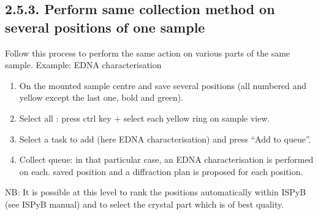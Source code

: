 \documentclass[a4paper,10pt,english]{sphinxmanual}
\begin{document}
\subsection{2.5.3. Perform same collection method on several positions of one sample}
\label{user_manual:perform-same-collection-method-on-several-positions-of-one-sample}
Follow this process to perform the same action on various parts of the same sample.
Example: EDNA characterisation
\begin{enumerate}
\item {} 
On the mounted sample centre and save several positions (all numbered and yellow except the last one, bold and green).

\item {} 
Select all : press ctrl key + select each yellow ring on sample view.

\item {} 
Select a task to add (here EDNA characterisation) and press “Add to queue”.

\item {} 
Collect queue: in that particular case, an EDNA characterisation is performed on each. saved position and a diffraction plan is proposed for each position.

\end{enumerate}

NB: It is possible at this level to rank the positions automatically within ISPyB (see ISPyB
manual) and to select the crystal part which is of best quality.
\end{document}
